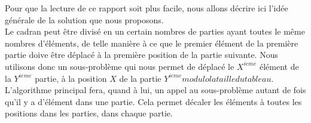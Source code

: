 Pour que la lecture de ce rapport soit plus facile, nous allons décrire ici l'idée générale de la solution que nous proposons. \\

Le cadran peut être divisé en un certain nombres de parties ayant toutes le même nombres d'éléments, de telle manière à ce que le premier élément de la première partie doive être déplacé à la première position de la partie suivante. Nous utilisons donc un sous-problème qui nous permet de déplacé le $X^{ieme}$ élément de la $Y^{ieme}$ partie, à la position $X$ de la partie $Y^{ieme} modulo la taille du tableau$. L'algorithme principal fera, quand à lui, un appel au sous-problème autant de fois qu'il y a d'élément dans une partie. Cela permet décaler les éléments à toutes les positions dans les parties, dans chaque partie. 